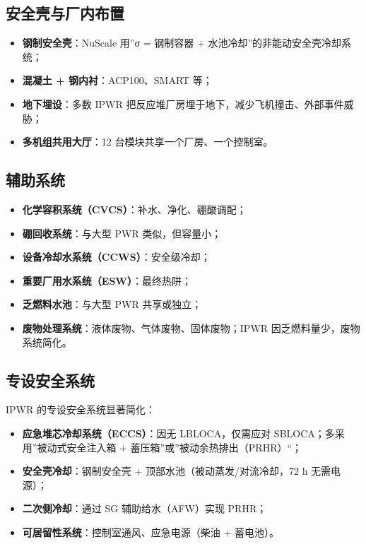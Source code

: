 \documentclass[
  UTF8,
  scheme=plain,
  fontsize=10pt,
  openany
]{ctexbook}
\begin{document}
\subsection{安全壳与厂内布置}\label{ux5b89ux5168ux58f3ux4e0eux5382ux5185ux5e03ux7f6e}

\begin{itemize}
\tightlist
\item
  \textbf{钢制安全壳}：NuScale 用''σ = 钢制容器 +
  水池冷却''的非能动安全壳冷却系统；
\item
  \textbf{混凝土 + 钢内衬}：ACP100、SMART 等；
\item
  \textbf{地下埋设}：多数 IPWR
  把反应堆厂房埋于地下，减少飞机撞击、外部事件威胁；
\item
  \textbf{多机组共用大厅}：12 台模块共享一个厂房、一个控制室。
\end{itemize}

\subsection{辅助系统}\label{ux8f85ux52a9ux7cfbux7edf}

\begin{itemize}
\tightlist
\item
  \textbf{化学容积系统（CVCS）}：补水、净化、硼酸调配；
\item
  \textbf{硼回收系统}：与大型 PWR 类似，但容量小；
\item
  \textbf{设备冷却水系统（CCWS）}：安全级冷却；
\item
  \textbf{重要厂用水系统（ESW）}：最终热阱；
\item
  \textbf{乏燃料水池}：与大型 PWR 共享或独立；
\item
  \textbf{废物处理系统}：液体废物、气体废物、固体废物；IPWR
  因乏燃料量少，废物系统简化。
\end{itemize}

\subsection{专设安全系统}\label{ux4e13ux8bbeux5b89ux5168ux7cfbux7edf}

IPWR 的专设安全系统显著简化：

\begin{itemize}
\tightlist
\item
  \textbf{应急堆芯冷却系统（ECCS）}：因无 LBLOCA，仅需应对
  SBLOCA；多采用''被动式安全注入箱 +
  蓄压箱''或''被动余热排出（PRHR）``；
\item
  \textbf{安全壳冷却}：钢制安全壳 + 顶部水池（被动蒸发/对流冷却，72 h
  无需电源）；
\item
  \textbf{二次侧冷却}：通过 SG 辅助给水（AFW）实现 PRHR；
\item
  \textbf{可居留性系统}：控制室通风、应急电源（柴油 + 蓄电池）。
\end{itemize}
\end{document}

